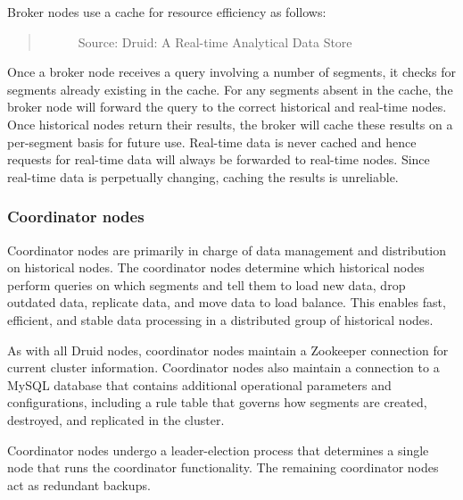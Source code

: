 \documentclass[letterpaper,10pt,english]{sphinxmanual}
\begin{document}
Broker nodes use a cache for resource efficiency as follows:
\begin{quote}

\begin{figure}[H]
\centering
\capstart

\noindent{}
\caption{Source: Druid: A Real-time Analytical Data Store}\label{\detokenize{discovery/part01/druid_nodes:id7}}\end{figure}
\end{quote}

Once a broker node receives a query involving a number of segments, it checks for segments already existing in the cache. For any segments absent in the cache, the broker node will forward the query to the correct historical and real-time nodes. Once historical nodes return their results, the broker will cache these results on a per-segment basis for future use. Real-time data is never cached and hence requests for real-time data will always be forwarded to real-time nodes. Since real-time data is perpetually changing, caching the results is unreliable.


\subsubsection{Coordinator nodes}
\label{\detokenize{discovery/part01/druid_nodes:coordinator}}\label{\detokenize{discovery/part01/druid_nodes:id1}}
Coordinator nodes are primarily in charge of data management and distribution on historical nodes. The coordinator nodes determine which historical nodes perform queries on which segments and tell them to load new data, drop outdated data, replicate data, and move data to load balance. This enables fast, efficient, and stable data processing in a distributed group of historical nodes.

As with all Druid nodes, coordinator nodes maintain a Zookeeper connection for current cluster information. Coordinator nodes also maintain a connection to a MySQL database that contains additional operational parameters and configurations, including a rule table that governs how segments are created, destroyed, and replicated in the cluster.

Coordinator nodes undergo a leader-election process that determines a single node that runs the coordinator functionality. The remaining coordinator nodes act as redundant backups.
\end{document}
